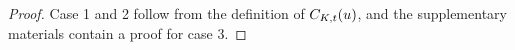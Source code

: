 \documentclass{article}
\begin{document}
\begin{proof}
  Case 1 and 2 follow from the definition of $C_{K,t}(u)$, and the
  supplementary materials contain a proof for case 3.



\end{proof}
\end{document}
